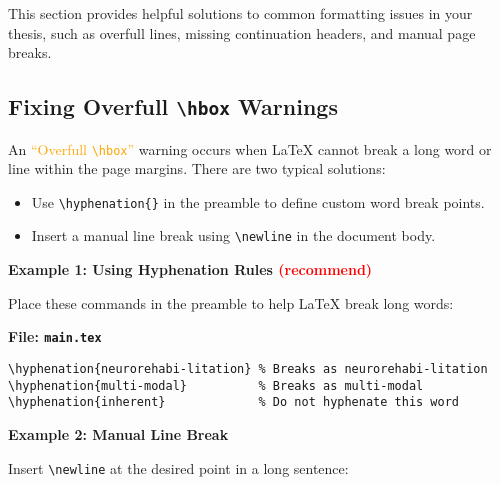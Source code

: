 \documentclass{VISTEC}
\begin{document}
\begin{paragraph}
This section provides helpful solutions to common formatting issues in your thesis, such as overfull lines, missing continuation headers, and manual page breaks.
\end{paragraph}

\subsection{Fixing Overfull \texttt{\textbackslash hbox} Warnings}
\label{manual:overflow-fix}

\begin{subparagraph}
An \textcolor{orange}{``Overfull \texttt{\textbackslash hbox}''} warning occurs when LaTeX cannot break a long word or line within the page margins. There are two typical solutions:
\end{subparagraph}

\begin{itemize}[leftmargin=\subparitemindent]
  \item Use \verb|\hyphenation{}| in the preamble to define custom word break points.
  \item Insert a manual line break using \verb|\newline| in the document body.
\end{itemize}

\begin{subparagraph}
\textbf{Example 1: Using Hyphenation Rules \textcolor{red}{(recommend)}}

Place these commands in the preamble to help LaTeX break long words:
\end{subparagraph}

\noindent\textbf{File: \texttt{main.tex}}\vspace{-1.5em}
\begin{verbatim}
\hyphenation{neurorehabi-litation} % Breaks as neurorehabi-litation
\hyphenation{multi-modal}          % Breaks as multi-modal
\hyphenation{inherent}             % Do not hyphenate this word
\end{verbatim}


\begin{subparagraph}
\textbf{Example 2: Manual Line Break}

Insert \verb|\newline| at the desired point in a long sentence:
\end{subparagraph}
\end{document}
